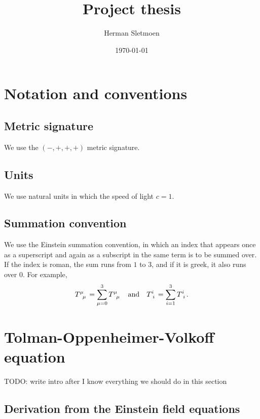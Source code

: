 \documentclass[a4paper,11pt,twoside]{report}
\title{Project thesis}
\author{Herman Sletmoen}
\date{\today}
\begin{document}
\maketitle

\tableofcontents

\chapter*{Notation and conventions} %

\section*{Metric signature}

We use the $(-,+,+,+)$ metric signature.

\section*{Units}

We use natural units in which the speed of light $c = 1$.

\section*{Summation convention}

We use the Einstein summation convention, in which an index that appears once as a superscript and again as a subscript in the same term is to be summed over.
If the index is roman, the sum runs from $1$ to $3$, and if it is greek, it also runs over $0$.
For example,
\begin{equation*}
	T\indices{^\mu_\mu} = \sum_{\mu=0}^3 T\indices{^\mu_\mu}
	\quad \text{and} \quad
	T\indices{^i_i} = \sum_{i=1}^3 T\indices{^i_i}
	.
\end{equation*}

\chapter{Tolman-Oppenheimer-Volkoff equation}

TODO: write intro after I know everything we should do in this section

\section{Derivation from the Einstein field equations}
\end{document}
